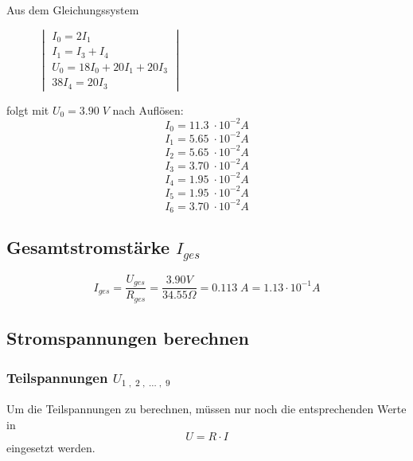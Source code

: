 \documentclass[a4paper,12pt]{article}
\begin{document}
Aus dem Gleichungssystem \\

\begin{figure}[H]
\centering
$\begin{vmatrix}
I_0 = 2I_1 \\
I_1 = I_3 + I_4 \\
U_0 = 18I_0 + 20I_1 + 20I_3\\
38I_4 = 20I_3
\end{vmatrix}$\\
\end{figure}

folgt mit $U_0 = 3.90\; V$ nach Auflösen:\\

$$I_0 = 11.3\; \cdot 10^{-2}A$$
$$I_1 = 5.65\; \cdot 10^{-2} A$$
$$I_2 = 5.65\; \cdot 10^{-2} A$$
$$I_3 = 3.70\; \cdot 10^{-2} A$$
$$I_4 = 1.95\; \cdot 10^{-2} A$$
$$I_5 = 1.95\; \cdot 10^{-2} A$$
$$I_6 = 3.70\; \cdot 10^{-2} A$$


\subsection{Gesamtstromstärke $I_{ges}$}

$$I_{ges} = \frac{U_{ges}}{R_{ges}} = \frac{3.90 V}{34.55\Omega} = 0.113 \;A = 1.13 \cdot 10^{-1} A$$

\subsection{Stromspannungen berechnen}

\subsubsection{Teilspannungen $U_{1\;,\;2\;,\; ...\;,\; 9}$}

Um die Teilspannungen zu berechnen, müssen nur noch die entsprechenden Werte in $$U = R \cdot I$$ eingesetzt werden.\\
\end{document}
